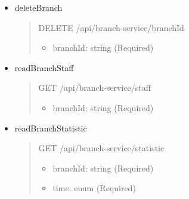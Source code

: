 \begin{itemize}
	\item deleteBranch
	\begin{quote}
		DELETE /api/branch-service/{branchId}
		\begin{itemize}
			\item branchId: string (Required)
		\end{itemize}
	\end{quote}

	\item readBranchStaff
	\begin{quote}
		GET /api/branch-service/staff
		\begin{itemize}
			\item branchId: string (Required)
		\end{itemize}
	\end{quote}

	\item readBranchStatistic
	\begin{quote}
		GET /api/branch-service/statistic
		\begin{itemize}
			\item branchId: string (Required)
			\item time: enum (Required)
		\end{itemize}
	\end{quote}
\end{itemize}

